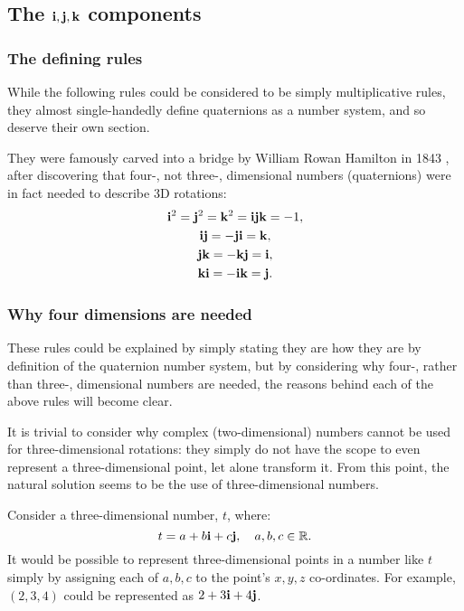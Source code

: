\documentclass[10pt]{article}
\begin{document}
\subsection{The $\vb{i, j, k}$ components} \label{ijkComponentsSection}

\subsubsection{The defining rules}

While the following rules \cite{Eater} could be considered to be simply multiplicative rules, they almost single-handedly define quaternions as a number system, and so deserve their own section.

They were famously carved into a bridge by William Rowan Hamilton in 1843 \cite{QuaternionWiki}, after discovering that four-, not three-, dimensional numbers (quaternions) were in fact needed to describe 3D rotations:
\begin{subequations} \label{MultProperties1}
    \begin{gather}
        \vb{i}^2 = \vb{j}^2 = \vb{k}^2 = \vb{i}\vb{j}\vb{k} = -1, \\
        \vb{ij} = -\vb{ji} = \vb{k}, \\
        \vb{jk} = -\vb{kj} = \vb{i}, \\
        \vb{ki} = -\vb{ik} = \vb{j}.
    \end{gather}
\end{subequations}

\subsubsection{Why four dimensions are needed}

These rules could be explained by simply stating they are how they are by definition of the quaternion number system, but by considering why four-, rather than three-, dimensional numbers are needed, the reasons behind each of the above rules will become clear.

It is trivial to consider why complex (two-dimensional) numbers cannot be used for three-dimensional rotations: they simply do not have the scope to even represent a three-dimensional point, let alone transform it. From this point, the natural solution seems to be the use of three-dimensional numbers.

Consider a three-dimensional number, $t$, where:
\begin{equation}
    t = a + b\vb{i} + c\vb{j}, \quad a, b, c \in \mathbb{R}.
\end{equation}
It would be possible to represent three-dimensional points in a number like $t$ simply by assigning each of $a, b, c$ to the point's $x, y, z$ co-ordinates. For example, $\left(2, 3, 4\right)$ could be represented as $2 + 3\vb{i} + 4\vb{j}$.
\end{document}
